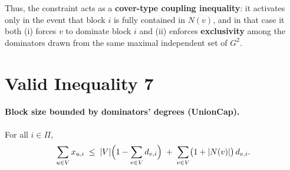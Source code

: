 Thus, the constraint acts as a \textbf{cover-type coupling inequality}: it activates only in the event that block $i$ is fully contained in $N(v)$, and in that case it both (i) forces $v$ to dominate block $i$ and (ii) enforces \textbf{exclusivity} among the dominators drawn from the same maximal independent set of $G^2$.


\section{Valid Inequality 7}

\paragraph{Block size bounded by dominators' degrees (UnionCap).}
For all $i\in\Pi$,
\[
\sum_{u\in V} x_{u,i}
\;\le\;
|V|\Bigl(1-\sum_{v\in V} d_{v,i}\Bigr)
\;+\;
\sum_{v\in V} \bigl(1+|N(v)|\bigr)\, d_{v,i}.
\]
